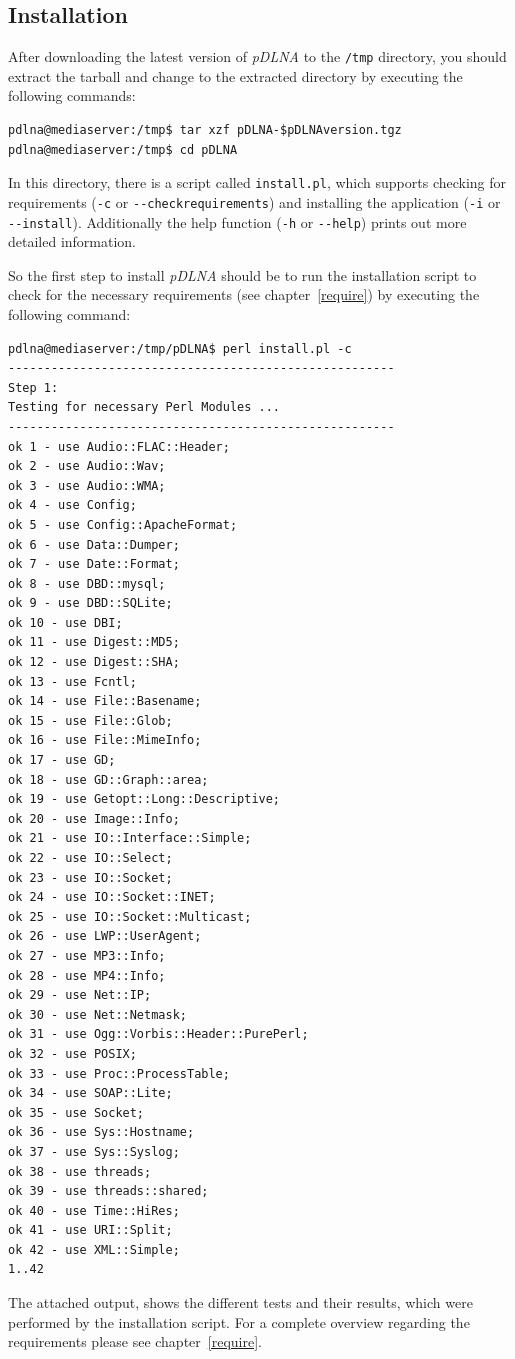 \documentclass[a4paper,oneside,10pt]{report}
\newenvironment{colframecmd}{%
  \begin{Sbox}
    \begin{minipage}{.99\columnwidth}
}{%
  \end{minipage}
  \end{Sbox}
  \begin{center}
    \fcolorbox{black}{LightSteelBlue}{\TheSbox}
  \end{center}
}
\begin{document}
\subsection{Installation}

After downloading the latest version of {\em pDLNA} to the \verb|/tmp| directory, you should extract the tarball and change to the extracted directory by executing the following commands:
\begin{colframecmd}
\begin{verbatim}
pdlna@mediaserver:/tmp$ tar xzf pDLNA-$pDLNAversion.tgz
pdlna@mediaserver:/tmp$ cd pDLNA
\end{verbatim}
\end{colframecmd}

In this directory, there is a script called \verb|install.pl|, which supports checking for requirements (\verb|-c| or \verb|--checkrequirements|) and installing the application (\verb|-i| or \verb|--install|). Additionally the help function (\verb|-h| or \verb|--help|) prints out more detailed information.

So the first step to install {\em pDLNA} should be to run the installation script to check for the necessary requirements (see chapter~\ref{require}) by executing the following command:
\begin{colframecmd}
\begin{verbatim}
pdlna@mediaserver:/tmp/pDLNA$ perl install.pl -c
------------------------------------------------------
Step 1:
Testing for necessary Perl Modules ...
------------------------------------------------------
ok 1 - use Audio::FLAC::Header;
ok 2 - use Audio::Wav;
ok 3 - use Audio::WMA;
ok 4 - use Config;
ok 5 - use Config::ApacheFormat;
ok 6 - use Data::Dumper;
ok 7 - use Date::Format;
ok 8 - use DBD::mysql;
ok 9 - use DBD::SQLite;
ok 10 - use DBI;
ok 11 - use Digest::MD5;
ok 12 - use Digest::SHA;
ok 13 - use Fcntl;
ok 14 - use File::Basename;
ok 15 - use File::Glob;
ok 16 - use File::MimeInfo;
ok 17 - use GD;
ok 18 - use GD::Graph::area;
ok 19 - use Getopt::Long::Descriptive;
ok 20 - use Image::Info;
ok 21 - use IO::Interface::Simple;
ok 22 - use IO::Select;
ok 23 - use IO::Socket;
ok 24 - use IO::Socket::INET;
ok 25 - use IO::Socket::Multicast;
ok 26 - use LWP::UserAgent;
ok 27 - use MP3::Info;
ok 28 - use MP4::Info;
ok 29 - use Net::IP;
ok 30 - use Net::Netmask;
ok 31 - use Ogg::Vorbis::Header::PurePerl;
ok 32 - use POSIX;
ok 33 - use Proc::ProcessTable;
ok 34 - use SOAP::Lite;
ok 35 - use Socket;
ok 36 - use Sys::Hostname;
ok 37 - use Sys::Syslog;
ok 38 - use threads;
ok 39 - use threads::shared;
ok 40 - use Time::HiRes;
ok 41 - use URI::Split;
ok 42 - use XML::Simple;
1..42
\end{verbatim}
\end{colframecmd}
The attached output, shows the different tests and their results, which were performed by the installation script. For a complete overview regarding the requirements please see chapter~\ref{require}.
\end{document}
